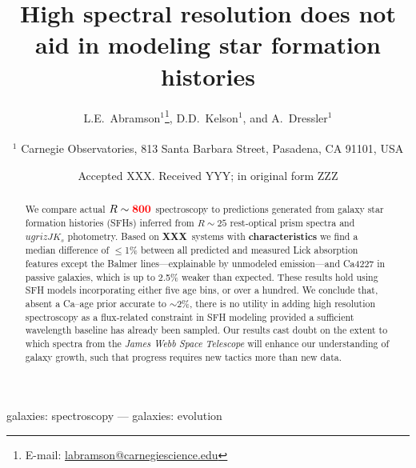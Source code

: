 \documentclass[a4paper,fleqn,usenatbib]{mnras}
\title[More is not better]{High spectral resolution does not aid in 
					modeling star formation histories}
\author[Abramson, Kelson, \& Dressler]{L.E.~Abramson$^{1}$\thanks{E-mail: \href{mailto:labramson@carnegiescience.edu}{labramson@carnegiescience.edu}},
D.D.~Kelson$^{1}$,
and A.~Dressler$^{1}$
\\
\\
$^1$	Carnegie Observatories, 813 Santa Barbara Street, Pasadena, CA 91101, USA\\
}
\date{Accepted XXX. Received YYY; in original form ZZZ}
\newcommand{\Mstel}{M_\ast}
\newcommand{\bfr}{\bf\color{red}}
\newcommand{\ntot}{{\bfr XXX}} %
\begin{document}
\label{firstpage}
\pagerange{\pageref{firstpage}--\pageref{lastpage}}
\maketitle

\begin{abstract}

	We compare actual $R\sim{\bfr 800}$ spectroscopy to predictions generated from galaxy 
	star formation histories (SFHs) inferred from $R\sim25$ rest-optical prism spectra 
	and $ugrizJK_{s}$ photometry. Based on \ntot\ systems with {\bfr characteristics} 
	we find a median difference of 
	$\leq$1\% between all predicted and measured Lick absorption features except the Balmer 
	lines---explainable by unmodeled emission---and Ca4227 in passive galaxies, 
	which is up to 2.5\% weaker than expected. These results hold using SFH models incorporating 
	either five age bins, or over a hundred. We conclude that, absent a Ca--age prior accurate to 
	$\sim$2\%, there is no utility in adding high resolution spectroscopy as a flux-related constraint 
	in SFH modeling provided a sufficient wavelength baseline has already been sampled. 
	Our results cast doubt on the extent to which 
	spectra from the {\it James Webb Space Telescope} will enhance our understanding of 
	galaxy growth, such that progress requires new tactics more than new data.

\end{abstract}

\begin{keywords}
	galaxies: spectroscopy --- galaxies: evolution
\end{keywords}

\end{document}
